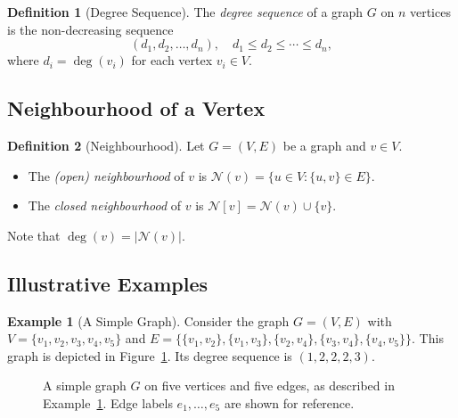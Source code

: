 \documentclass[12pt,a4paper]{article}
\theoremstyle{definition}
\newtheorem{definition}{Definition}[section]
\newtheorem{example}{Example}[section]
\theoremstyle{plain}
\newcommand{\N}[1]{\mathcal{N}(#1)}
\newcommand{\Nc}[1]{\mathcal{N}[#1]}
\newcommand{\dg}[1]{\deg(#1)}
\begin{document}
\begin{definition}[Degree Sequence]\label{def:degseq}
  The \emph{degree sequence} of a graph \(G\) on \(n\) vertices is the
  non-decreasing sequence
  \begin{equation}
    (d_1, d_2, \ldots, d_n), \quad d_1 \le d_2 \le \cdots \le d_n,
    \label{eq:degseq}
  \end{equation}
  where \(d_i = \deg(v_i)\) for each vertex \(v_i \in V\).
\end{definition}

\subsection{Neighbourhood of a Vertex}

\begin{definition}[Neighbourhood]\label{def:neighbourhood}
  Let \(G = (V,E)\) be a graph and \(v \in V\).
  \begin{itemize}
    \item The \emph{(open) neighbourhood} of \(v\) is
          \(\N{v} = \{u \in V : \{u,v\} \in E\}\).
    \item The \emph{closed neighbourhood} of \(v\) is
          \(\Nc{v} = \N{v} \cup \{v\}\).
  \end{itemize}
  Note that \(\dg{v} = |\N{v}|\).
\end{definition}

\subsection{Illustrative Examples}

\begin{example}[A Simple Graph]\label{ex:simple-graph}
  Consider the graph \(G = (V,E)\) with
  \(V = \{v_1, v_2, v_3, v_4, v_5\}\) and
  \(E = \{\{v_1,v_2\}, \{v_1,v_3\}, \{v_2,v_4\}, \{v_3,v_4\}, \{v_4,v_5\}\}\).
  This graph is depicted in Figure~\ref{fig:simple-graph}.
  Its degree sequence is \((1,2,2,2,3)\).
\end{example}

\begin{figure}[htbp]
  \centering
  \caption{A simple graph \(G\) on five vertices and five edges, as described
           in Example~\ref{ex:simple-graph}.  Edge labels \(e_1,\ldots,e_5\)
           are shown for reference.}
  \label{fig:simple-graph}
\end{figure}
\end{document}
